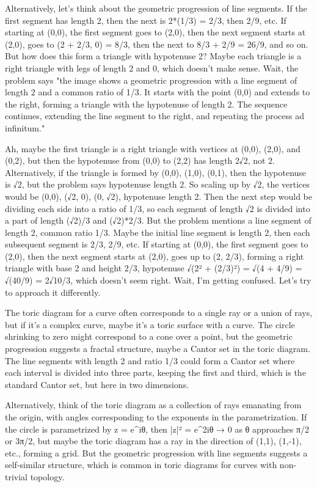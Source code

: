 Alternatively, let's think about the geometric progression of line segments. If the first segment has length 2, then the next is 2*(1/3) = 2/3, then 2/9, etc. If starting at (0,0), the first segment goes to (2,0), then the next segment starts at (2,0), goes to (2 + 2/3, 0) = 8/3, then the next to 8/3 + 2/9 = 26/9, and so on. But how does this form a triangle with hypotenuse 2? Maybe each triangle is a right triangle with legs of length 2 and 0, which doesn't make sense. Wait, the problem says "the image shows a geometric progression with a line segment of length 2 and a common ratio of 1/3. It starts with the point (0,0) and extends to the right, forming a triangle with the hypotenuse of length 2. The sequence continues, extending the line segment to the right, and repeating the process ad infinitum."

Ah, maybe the first triangle is a right triangle with vertices at (0,0), (2,0), and (0,2), but then the hypotenuse from (0,0) to (2,2) has length 2√2, not 2. Alternatively, if the triangle is formed by (0,0), (1,0), (0,1), then the hypotenuse is √2, but the problem says hypotenuse length 2. So scaling up by √2, the vertices would be (0,0), (√2, 0), (0, √2), hypotenuse length 2. Then the next step would be dividing each side into a ratio of 1/3, so each segment of length √2 is divided into a part of length (√2)/3 and (√2)*2/3. But the problem mentions a line segment of length 2, common ratio 1/3. Maybe the initial line segment is length 2, then each subsequent segment is 2/3, 2/9, etc. If starting at (0,0), the first segment goes to (2,0), then the next segment starts at (2,0), goes up to (2, 2/3), forming a right triangle with base 2 and height 2/3, hypotenuse √(2² + (2/3)²) = √(4 + 4/9) = √(40/9) = 2√10/3, which doesn't seem right. Wait, I'm getting confused. Let's try to approach it differently.

The toric diagram for a curve often corresponds to a single ray or a union of rays, but if it's a complex curve, maybe it's a toric surface with a curve. The circle shrinking to zero might correspond to a cone over a point, but the geometric progression suggests a fractal structure, maybe a Cantor set in the toric diagram. The line segments with length 2 and ratio 1/3 could form a Cantor set where each interval is divided into three parts, keeping the first and third, which is the standard Cantor set, but here in two dimensions.

Alternatively, think of the toric diagram as a collection of rays emanating from the origin, with angles corresponding to the exponents in the parametrization. If the circle is parametrized by z = e^{iθ}, then |z|² = e^{2iθ} → 0 as θ approaches π/2 or 3π/2, but maybe the toric diagram has a ray in the direction of (1,1), (1,-1), etc., forming a grid. But the geometric progression with line segments suggests a self-similar structure, which is common in toric diagrams for curves with non-trivial topology.


